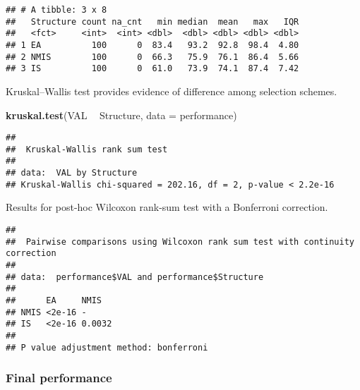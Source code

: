 \documentclass[]{book}
\newenvironment{Shaded}{\begin{snugshade}}{\end{snugshade}}
\newcommand{\DataTypeTok}[1]{\textcolor[rgb]{0.13,0.29,0.53}{#1}}
\newcommand{\KeywordTok}[1]{\textcolor[rgb]{0.13,0.29,0.53}{\textbf{#1}}}
\newcommand{\NormalTok}[1]{#1}
\newcommand{\OperatorTok}[1]{\textcolor[rgb]{0.81,0.36,0.00}{\textbf{#1}}}
\newcommand{\OtherTok}[1]{\textcolor[rgb]{0.56,0.35,0.01}{#1}}
\newcommand{\StringTok}[1]{\textcolor[rgb]{0.31,0.60,0.02}{#1}}
\begin{document}
\begin{verbatim}
## # A tibble: 3 x 8
##   Structure count na_cnt   min median  mean   max   IQR
##   <fct>     <int>  <int> <dbl>  <dbl> <dbl> <dbl> <dbl>
## 1 EA          100      0  83.4   93.2  92.8  98.4  4.80
## 2 NMIS        100      0  66.3   75.9  76.1  86.4  5.66
## 3 IS          100      0  61.0   73.9  74.1  87.4  7.42
\end{verbatim}

Kruskal--Wallis test provides evidence of difference among selection schemes.

\begin{Shaded}
\begin{Highlighting}[]
\KeywordTok{kruskal.test}\NormalTok{(VAL }\OperatorTok{~}\StringTok{ }\NormalTok{Structure, }\DataTypeTok{data =}\NormalTok{ performance)}
\end{Highlighting}
\end{Shaded}

\begin{verbatim}
## 
##  Kruskal-Wallis rank sum test
## 
## data:  VAL by Structure
## Kruskal-Wallis chi-squared = 202.16, df = 2, p-value < 2.2e-16
\end{verbatim}

Results for post-hoc Wilcoxon rank-sum test with a Bonferroni correction.

\begin{Shaded}
\end{Shaded}

\begin{verbatim}
## 
##  Pairwise comparisons using Wilcoxon rank sum test with continuity correction 
## 
## data:  performance$VAL and performance$Structure 
## 
##      EA     NMIS  
## NMIS <2e-16 -     
## IS   <2e-16 0.0032
## 
## P value adjustment method: bonferroni
\end{verbatim}

\hypertarget{final-performance-3}{%
\subsubsection{Final performance}\label{final-performance-3}}
\end{document}
